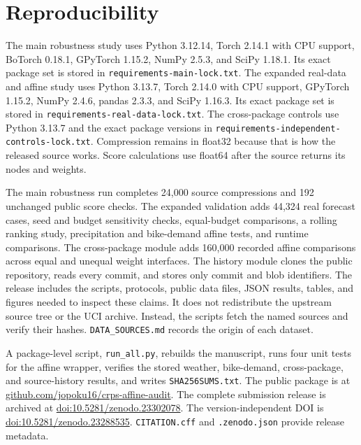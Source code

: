 \documentclass[11pt]{article}
\begin{document}
\section{Reproducibility}

The main robustness study uses Python 3.12.14, Torch 2.14.1 with CPU support, BoTorch 0.18.1, GPyTorch 1.15.2, NumPy 2.5.3, and SciPy 1.18.1. Its exact package set is stored in \texttt{requirements-main-lock.txt}. The expanded real-data and affine study uses Python 3.13.7, Torch 2.14.0 with CPU support, GPyTorch 1.15.2, NumPy 2.4.6, pandas 2.3.3, and SciPy 1.16.3. Its exact package set is stored in \texttt{requirements-real-data-lock.txt}. The cross-package controls use Python 3.13.7 and the exact package versions in \texttt{requirements-independent-controls-lock.txt}. Compression remains in float32 because that is how the released source works. Score calculations use float64 after the source returns its nodes and weights.

The main robustness run completes 24,000 source compressions and 192 unchanged public score checks. The expanded validation adds 44,324 real forecast cases, seed and budget sensitivity checks, equal-budget comparisons, a rolling ranking study, precipitation and bike-demand affine tests, and runtime comparisons. The cross-package module adds 160,000 recorded affine comparisons across equal and unequal weight interfaces. The history module clones the public repository, reads every commit, and stores only commit and blob identifiers. The release includes the scripts, protocols, public data files, JSON results, tables, and figures needed to inspect these claims. It does not redistribute the upstream source tree or the UCI archive. Instead, the scripts fetch the named sources and verify their hashes. \texttt{DATA\_SOURCES.md} records the origin of each dataset.

A package-level script, \texttt{run\_all.py}, rebuilds the manuscript, runs four unit tests for the affine wrapper, verifies the stored weather, bike-demand, cross-package, and source-history results, and writes \texttt{SHA256SUMS.txt}. The public package is at \href{https://github.com/jopoku16/crps-affine-audit}{github.com/jopoku16/crps-affine-audit}. The complete submission release is archived at \href{https://doi.org/10.5281/zenodo.23302078}{doi:10.5281/zenodo.23302078}. The version-independent DOI is \href{https://doi.org/10.5281/zenodo.23288535}{doi:10.5281/zenodo.23288535}. \texttt{CITATION.cff} and \texttt{.zenodo.json} provide release metadata.
\end{document}
